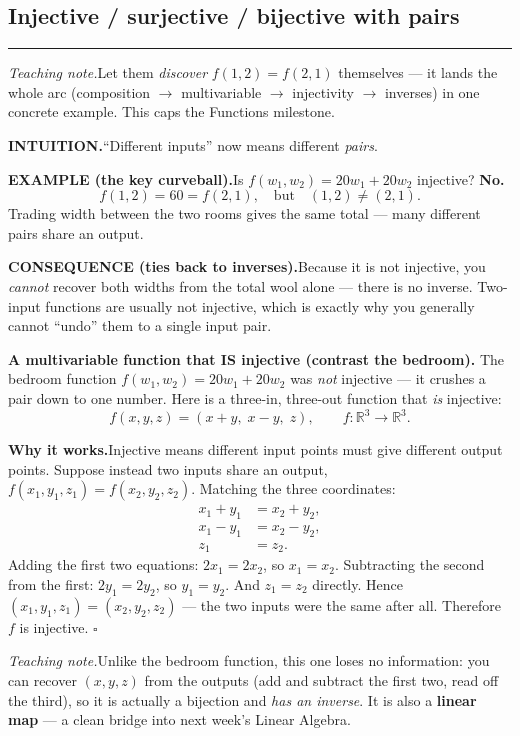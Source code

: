 \documentclass[12pt]{article}
\begin{document}
\subsection*{Injective / surjective / bijective with pairs}
\hrule

\textit{Teaching note.}\quad Let them \emph{discover} $f(1,2) = f(2,1)$ themselves --- it lands the whole arc (composition $\to$ multivariable $\to$ injectivity $\to$ inverses) in one concrete example. This caps the Functions milestone.

\textbf{INTUITION.}\quad ``Different inputs'' now means different \emph{pairs}.

\textbf{EXAMPLE (the key curveball).}\quad Is $f(w_1, w_2) = 20w_1 + 20w_2$ injective? \textbf{No.}
\[
  f(1,2) = 60 = f(2,1), \quad\text{but}\quad (1,2) \ne (2,1).
\]
Trading width between the two rooms gives the same total --- many different pairs share an output.

\textbf{CONSEQUENCE (ties back to inverses).}\quad Because it is not injective, you \emph{cannot} recover both widths from the total wool alone --- there is no inverse. Two-input functions are usually not injective, which is exactly why you generally cannot ``undo'' them to a single input pair.


\textbf{A multivariable function that IS injective (contrast the bedroom).}\quad
The bedroom function $f(w_1,w_2)=20w_1+20w_2$ was \emph{not} injective --- it crushes a pair down to one number. Here is a three-in, three-out function that \emph{is} injective:
\[
  f(x,y,z) = (x+y,\; x-y,\; z), \qquad f\colon \mathbb{R}^3 \to \mathbb{R}^3.
\]

\textbf{Why it works.}\quad Injective means different input points must give different output points. Suppose instead two inputs share an output, $f(x_1,y_1,z_1) = f(x_2,y_2,z_2)$. Matching the three coordinates:
\[
  \begin{aligned}
    x_1 + y_1 &= x_2 + y_2, \\
    x_1 - y_1 &= x_2 - y_2, \\
    z_1 &= z_2.
  \end{aligned}
\]
Adding the first two equations: $2x_1 = 2x_2$, so $x_1 = x_2$. Subtracting the second from the first: $2y_1 = 2y_2$, so $y_1 = y_2$. And $z_1 = z_2$ directly. Hence $(x_1,y_1,z_1) = (x_2,y_2,z_2)$ --- the two inputs were the same after all. Therefore $f$ is injective. $\square$

\textit{Teaching note.}\quad Unlike the bedroom function, this one loses no information: you can recover $(x,y,z)$ from the outputs (add and subtract the first two, read off the third), so it is actually a bijection and \emph{has an inverse}. It is also a \textbf{linear map} --- a clean bridge into next week's Linear Algebra.
\end{document}

